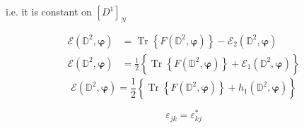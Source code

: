 \documentclass[aps,preprint]{revtex4}%
\begin{document}
i.e. it is constant on $\left[  D^{1}\right]  _{N}$

\bigskip%

\begin{subequations}
\label{FE}%
\begin{align*}
\mathcal{E}\left(  \mathbb{D}^{2},\bm{\varphi}\right)   &  =\operatorname{Tr}%
\left\{  F\left(  \mathbb{D}^{2},\bm{\varphi}\right)  \right\}  -\mathcal{E}%
_{2}\left(  \mathbb{D}^{2},\bm{\varphi}\right) \\
\mathcal{E}\left(  \mathbb{D}^{2},\bm{\varphi}\right)   &  =\frac{1}%
{2}\left\{  \overset{}{\operatorname{Tr}\left\{  F\left(  \mathbb{D}%
^{2},\bm{\varphi}\right)  \right\}  +\mathcal{E}_{1}\left(  \mathbb{D}%
^{2},\bm{\varphi}\right)  }\right\}
\end{align*}%
\end{subequations}
\[
\mathcal{E}\left(  \mathbb{D}^{2},\bm{\varphi}\right)  =\frac{1}{2}\left\{
\overset{}{\operatorname{Tr}\left\{  F\left(  \mathbb{D}^{2}%
,\bm{\varphi}\right)  \right\}  +h_{1}\left(  \mathbb{D}^{2}%
,\bm{\varphi}\right)  }\right\}
\]


\bigskip%

\[
\varepsilon_{jk}=\varepsilon_{kj}^{\ast}%
\]
\end{document}
